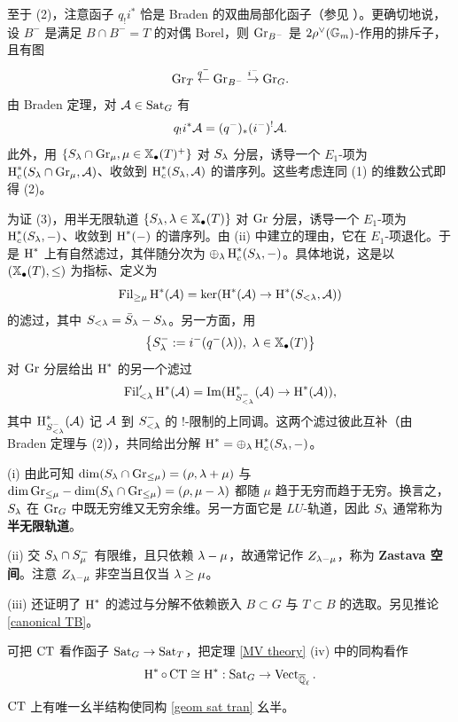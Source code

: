 至于 (2)，注意函子 $q_!i^*$ 恰是 Braden 的双曲局部化函子（参见 \cite{Br}）。更确切地说，设 $B^-$ 是满足 $B\cap B^-=T$ 的对偶 Borel，则 ${\operatorname{Gr}}_{B^-}$ 是 $2\rho^\vee({\mathbb G}_m)$-作用的排斥子，且有图
\[{\operatorname{Gr}}_T\stackrel{q^-}{\leftarrow}{\operatorname{Gr}}_{B^-}\stackrel{i^-}{\to}{\operatorname{Gr}}_G.\]
由 Braden 定理，对 ${\mathcal A}\in{\operatorname{Sat}}_G$ 有
\[q_!i^*{\mathcal A}=(q^-)_*(i^-)^!{\mathcal A}.\]
此外，用 $\{S_{\lambda}\cap{\operatorname{Gr}}_\mu, \mu\in\mathbb{X}_\bullet(T)^+\}$ 对 $S_{\lambda}$ 分层，诱导一个 $E_1$-项为 $\operatorname{H}_c^*(S_{\lambda}\cap{\operatorname{Gr}}_\mu,{\mathcal A})$、收敛到 $\operatorname{H}_c^*(S_{\lambda},{\mathcal A})$ 的谱序列。这些考虑连同 (1) 的维数公式即得 (2)。

为证 (3)，用半无限轨道 $\{S_{\lambda}, {\lambda}\in\mathbb{X}_\bullet(T)\}$ 对 ${\operatorname{Gr}}$ 分层，诱导一个 $E_1$-项为 $\operatorname{H}_c^*(S_{\lambda},-)$、收敛到 $\operatorname{H}^*(-)$ 的谱序列。由 (ii) 中建立的理由，它在 $E_1$-项退化。于是 $\operatorname{H}^*$ 上有自然滤过，其伴随分次为 $\oplus_{\lambda} \operatorname{H}_c^*(S_{\lambda},-)$。具体地说，这是以 $(\mathbb{X}_\bullet(T),\leq)$ 为指标、定义为
\[\operatorname{Fil}_{\geq \mu}\operatorname{H}^*({\mathcal A})=\ker(\operatorname{H}^*({\mathcal A})\to \operatorname{H}^*(S_{<{\lambda}},{\mathcal A}))\]
的滤过，其中 $S_{<{\lambda}}=\bar{S}_{\lambda}-S_{\lambda}$。另一方面，用
\[\left\{S^-_\la:=i^-(q^-(\la)),\ \la\in\xcoch(T)\right\}\]
对 ${\operatorname{Gr}}$ 分层给出 $\operatorname{H}^*$ 的另一个滤过
\[\operatorname{Fil}'_{<{\lambda}}\operatorname{H}^*({\mathcal A})=\operatorname{Im}(\operatorname{H}^*_{S^-_{<{\lambda}}}({\mathcal A})\to \operatorname{H}^*({\mathcal A})),\]
其中 $\operatorname{H}^*_{S^-_{<{\lambda}}}({\mathcal A})$ 记 ${\mathcal A}$ 到 $S^-_{<{\lambda}}$ 的 $!$-限制的上同调。这两个滤过彼此互补（由 Braden 定理与 (2)），共同给出分解 $\operatorname{H}^*=\oplus_{\lambda} \operatorname{H}_c^*(S_{\lambda},-)$。

\begin{rmk}
(i) 由此可知 $\dim (S_{\lambda}\cap {\operatorname{Gr}}_{\leq \mu})=(\rho,{\lambda}+\mu)$ 与 $\dim {\operatorname{Gr}}_{\leq \mu}-\dim (S_{\lambda}\cap {\operatorname{Gr}}_{\leq \mu})=(\rho,\mu-{\lambda})$ 都随 $\mu$ 趋于无穷而趋于无穷。换言之，$S_{\lambda}$ 在 ${\operatorname{Gr}}_G$ 中既无穷维又无穷余维。另一方面它是 $LU$-轨道，因此 $S_{\lambda}$ 通常称为\textbf{半无限轨道}。

(ii) 交 $S_{\lambda}\cap S^-_\mu$ 有限维，且只依赖 ${\lambda}-\mu$，故通常记作 $Z_{{\lambda}-\mu}$，称为 \textbf{Zastava 空间}。注意 $Z_{{\lambda}-\mu}$ 非空当且仅当 ${\lambda}\geq \mu$。

(iii) \cite[Theorem 3.6]{MV} 还证明了 $\operatorname{H}^*$ 的滤过与分解不依赖嵌入 $B\subset G$ 与 $T\subset B$ 的选取。另见推论 \ref{canonical TB}。
\end{rmk}

可把 $\operatorname{CT}$ 看作函子 ${\operatorname{Sat}}_G\to {\operatorname{Sat}}_T$，把定理 \ref{MV theory} (iv) 中的同构看作
\begin{equation}\label{geom sat tran}
\operatorname{H}^*\circ \operatorname{CT}\cong \operatorname{H}^*: {\operatorname{Sat}}_G\to \operatorname{Vect}_{\overline{{\mathbb Q}}_\ell}.
\end{equation}

\begin{prop}
$\operatorname{CT}$ 上有唯一幺半结构使同构 \eqref{geom sat tran} 幺半。
\end{prop}

